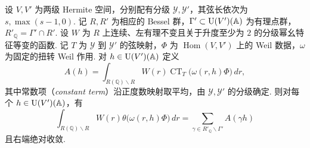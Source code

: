 \begin{lemma}
\label{lem:a-bessel-orbit-unfold}
\emitthmsource
设 $V,V'$ 为两级 Hermite 空间，分别配有分级 $\mathcal Y,\mathcal Y'$，其弦长依次为 $s,\max(s-1,0)$. 记 $R,R'$ 为相应的 Bessel 群，$\Gamma'\subset \operatorname{U}(V')(\mathbb A)$ 为有理点群，$R'_{\mathbb Q}=\Gamma'\cap R'$. 设 $W$ 为 $R$ 上连续、左有理不变且关于升度至少为 $2$ 的分级幂幺特征等变的函数. 记 $T$ 为 $\mathcal Y$ 到 $\mathcal Y'$ 的弦映射，$\Phi$ 为 $\operatorname{Hom}(V,V')$ 上的 Weil 数据，$\omega$ 为固定的扭转 Weil 作用. 对 $h\in \operatorname{U}(V')(\mathbb A)$ 定义
\[
 A(h)=\int_{R(\mathbb Q)\backslash R}W(r)
        \operatorname{CT}_{T}\bigl(\omega(r,h)\Phi\bigr)\,dr ,
\]
其中常数项（\emph{constant term}）沿正度数映射取平均，由 $\mathcal Y,\mathcal Y'$ 的分级确定. 则对每个 $h\in \operatorname{U}(V')(\mathbb A)$，有
\[
 \int_{R(\mathbb Q)\backslash R}
       W(r)\theta\bigl(\omega(r,h)\Phi\bigr)\,dr
   =\sum_{\gamma\in R'_{\mathbb Q}\backslash\Gamma'} A(\gamma h)
\]
且右端绝对收敛.
\end{lemma}
